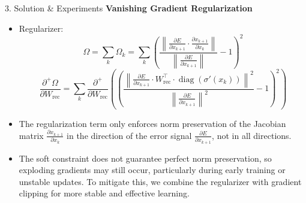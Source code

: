 \begin{frame}[t]
\begin{columns}[t,totalwidth=\textwidth]
\begin{column}{0.33\textwidth}
\begin{block}{3. Solution \& Experiments}
      \textbf{Vanishing Gradient Regularization}
      \begin{itemize}
        \item Regularizer: \[
            \Omega = \sum_k \Omega_k = \sum_k \left(  \frac{ \left\| \frac{\partial E}{\partial x_{k+1}} \cdot \frac{\partial x_{k+1}}{\partial x_k} \right\| }
            { \left\| \frac{\partial E}{\partial x_{k+1}} \right\| } - 1 
            \right)^2
            \]
            \[
            \textstyle
            \frac{\partial^+ \Omega}{\partial W_{\text{rec}}} = \sum_k 
            \frac{\partial^+}{\partial W_{\text{rec}}} \left(
            \left( 
            \frac{ \left\| \frac{\partial E}{\partial x_{k+1}} \cdot W_{\text{rec}}^\top \cdot \operatorname{diag}\left( \sigma'(x_k) \right) \right\|^2 }
            { \left\| \frac{\partial E}{\partial x_{k+1}} \right\|^2 } - 1 
            \right)^2
            \right)
            \]

        \item The regularization term only enforces norm preservation of the Jacobian matrix
                $\frac{\partial x_{k+1}}{\partial x_k}$ in the direction of the error signal 
                $\frac{\partial E}{\partial x_{k+1}}$, not in all directions.
        \item The soft constraint does not guarantee perfect norm preservation, so exploding gradients may still occur, particularly during early training or unstable updates. To mitigate this, we combine the regularizer with gradient clipping for more stable and effective learning.


      \end{itemize}


\end{block}
\end{column}
\end{columns}
\end{frame}

